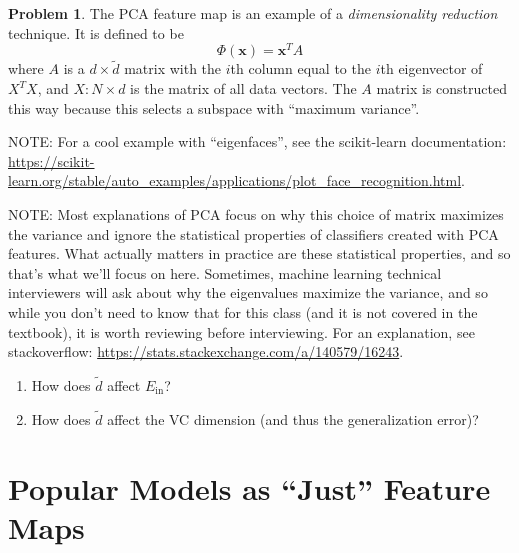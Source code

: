 \documentclass[10pt]{exam}
\theoremstyle{definition}
\newtheorem{problem}{Problem}
\newcommand{\Ein}{E_{\text{in}}}
\newcommand{\trans}[1]{{#1}^{T}}
\newcommand{\x}{\mathbf x}
\begin{document}

%

\newpage
\begin{problem}
    The PCA feature map is an example of a \emph{dimensionality reduction} technique.
    It is defined to be
    \begin{equation}
        \Phi(\x) = \trans\x A
    \end{equation}
    where $A$ is a $d\times 	\tilde d$ matrix with the $i$th column equal to the $i$th eigenvector of $\trans X X$,
    and $X : N \times d$ is the matrix of all data vectors.
    The $A$ matrix is constructed this way because this selects a subspace with ``maximum variance''.

    NOTE:
    For a cool example with ``eigenfaces'', see the scikit-learn documentation:
    \url{https://scikit-learn.org/stable/auto_examples/applications/plot_face_recognition.html}.
    
    NOTE: Most explanations of PCA focus on why this choice of matrix maximizes the variance and ignore the statistical properties of classifiers created with PCA features.
    What actually matters in practice are these statistical properties, and so that's what we'll focus on here.
    Sometimes, machine learning technical interviewers will ask about why the eigenvalues maximize the variance, and so while you don't need to know that for this class (and it is not covered in the textbook), it is worth reviewing before interviewing.
    For an explanation, see stackoverflow: \url{https://stats.stackexchange.com/a/140579/16243}.

    \begin{enumerate}
    \item How does $\tilde d$ affect $\Ein$?
        \vspace{3in}
    \item How does $\tilde d$ affect the VC dimension (and thus the generalization error)?
        \vspace{3in}
    \end{enumerate}
\end{problem}

\section*{Popular Models as ``Just'' Feature Maps}
\end{document}

